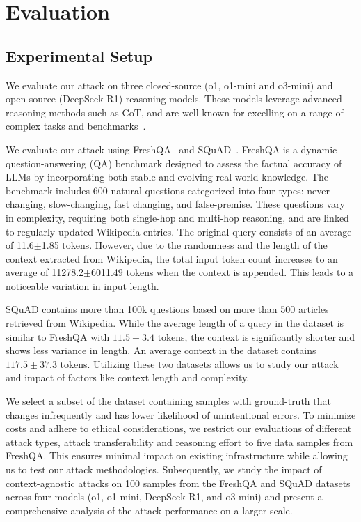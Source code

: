 
\section{Evaluation}
\label{sec:exps}

\subsection{Experimental Setup}


 We evaluate our attack on three closed-source (o1, o1-mini and o3-mini) and open-source (DeepSeek-R1) reasoning models. These models leverage advanced reasoning methods such as CoT, and are well-known for excelling on a range of complex tasks and benchmarks~\cite{guo2025deepseek, sun2023survey}.

 We evaluate our attack using FreshQA~\cite{vu2023freshllms} and SQuAD~\cite{rajpurkar2018know}. FreshQA is a dynamic question-answering (QA) benchmark designed to assess the factual accuracy of LLMs by incorporating both stable and evolving real-world knowledge. The benchmark includes 600 natural questions categorized into four types: never-changing, slow-changing, fast changing, and false-premise. These questions vary in complexity, requiring both single-hop and multi-hop reasoning, and are linked to regularly updated Wikipedia entries. The original query consists of an average of 11.6$\pm$1.85 tokens. However, due to the randomness and the length of the context extracted from Wikipedia, the total input token count increases to an average of 11278.2$\pm$6011.49 tokens when the context is appended. This leads to a noticeable variation in input length.

SQuAD contains more than 100k questions based on more than 500 articles retrieved from Wikipedia. While the average length of a query in the dataset is similar to FreshQA with $11.5\pm3.4$ tokens, the context is significantly shorter and shows less variance in length. An average context in the dataset contains $117.5\pm37.3$ tokens.  Utilizing these two datasets allows us to study our attack and impact of factors like context length and complexity.

We select a subset of the dataset containing samples with ground-truth that changes infrequently and has lower likelihood of unintentional errors. To minimize costs and adhere to ethical considerations, we restrict our evaluations of different attack types, attack transferability and reasoning effort to five data samples from FreshQA. This ensures minimal impact on existing infrastructure while allowing us to test our attack methodologies. Subsequently, we study the impact of context-agnostic attacks on 100 samples from the FreshQA and SQuAD datasets across four models (o1, o1-mini, DeepSeek-R1, and o3-mini) and present a comprehensive analysis of the attack performance on a larger scale.







